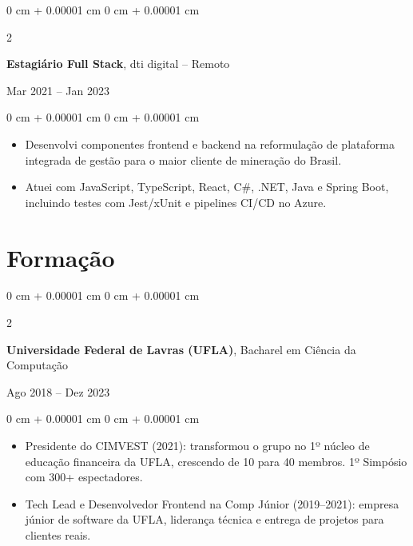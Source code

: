 \documentclass[10pt, a4paper]{article}
\newenvironment{highlights}{
    \begin{itemize}[
        topsep=0.05 cm,
        parsep=0.05 cm,
        partopsep=0pt,
        itemsep=0pt,
        leftmargin=0 cm + 10pt
    ]
}{
    \end{itemize}
}
\newenvironment{onecolentry}{
    \begin{adjustwidth}{
        0 cm + 0.00001 cm
    }{
        0 cm + 0.00001 cm
    }
}{
    \end{adjustwidth}
}
\newenvironment{twocolentry}[2][]{
    \onecolentry
    \def\secondColumn{#2}
    \setcolumnwidth{\fill, 4.5 cm}
    \begin{paracol}{2}
}{
    \switchcolumn \raggedleft \secondColumn
    \end{paracol}
    \endonecolentry
}
\begin{document}
    \vspace{0.18 cm}

    \begin{twocolentry}{Mar 2021 -- Jan 2023}
        \textbf{Estagiário Full Stack}, dti digital -- Remoto
    \end{twocolentry}
    \vspace{0.10 cm}
    \begin{onecolentry}
        \begin{highlights}
            \item Desenvolvi componentes frontend e backend na reformulação de plataforma integrada de gestão para o maior cliente de mineração do Brasil.
            \item Atuei com JavaScript, TypeScript, React, C\#, .NET, Java e Spring Boot, incluindo testes com Jest/xUnit e pipelines CI/CD no Azure.
        \end{highlights}
    \end{onecolentry}

    \section{Formação}

    \begin{twocolentry}{Ago 2018 -- Dez 2023}
        \textbf{Universidade Federal de Lavras (UFLA)}, Bacharel em Ciência da Computação
    \end{twocolentry}
    \vspace{0.10 cm}
    \begin{onecolentry}
        \begin{highlights}
            \item Presidente do CIMVEST (2021): transformou o grupo no 1º núcleo de educação financeira da UFLA, crescendo de 10 para 40 membros. 1º Simpósio com 300+ espectadores.
            \item Tech Lead e Desenvolvedor Frontend na Comp Júnior (2019--2021): empresa júnior de software da UFLA, liderança técnica e entrega de projetos para clientes reais.
        \end{highlights}
    \end{onecolentry}

\end{document}

